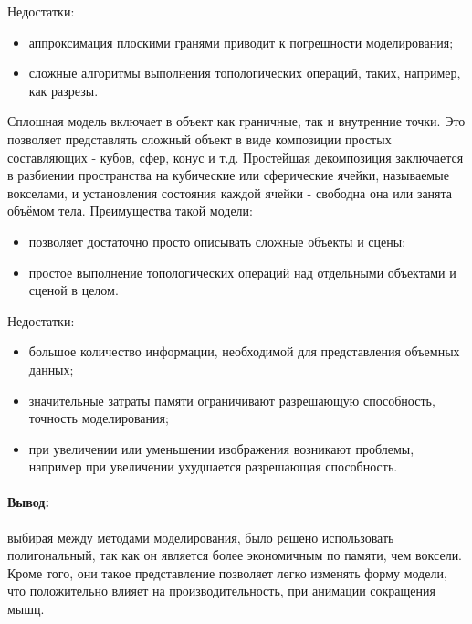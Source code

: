 Недостатки:
\begin{itemize}
	\item аппроксимация плоскими гранями приводит к погрешности моделирования;
	\item сложные алгоритмы выполнения топологических операций, таких, например, как разрезы.
\end{itemize}
\par Сплошная модель включает в объект как граничные, так и внутренние точки. Это позволяет представлять сложный объект в виде композиции простых составляющих - кубов, сфер, конус и т.д. Простейшая декомпозиция заключается в разбиении пространства на кубические или сферические ячейки, называемые вокселами, и установления состояния каждой ячейки - свободна она или занята объёмом тела. Преимущества такой модели:
\begin{itemize}
	\item позволяет достаточно просто описывать сложные объекты и сцены;
	\item простое выполнение топологических операций над отдельными объектами и сценой в целом.
\end{itemize}
Недостатки:
\begin{itemize}
	\item большое количество информации, необходимой для представления объемных данных;
	\item значительные затраты памяти ограничивают разрешающую способность, точность моделирования;
	\item при увеличении или уменьшении изображения возникают проблемы, например при увеличении ухудшается разрешающая способность.
\end{itemize}
\paragraph{Вывод:} выбирая между методами моделирования, было решено использовать полигональный, так как он является более экономичным по памяти, чем воксели. Кроме того, они такое представление позволяет легко изменять форму модели, что положительно влияет на производительность, при анимации сокращения мышц. 


